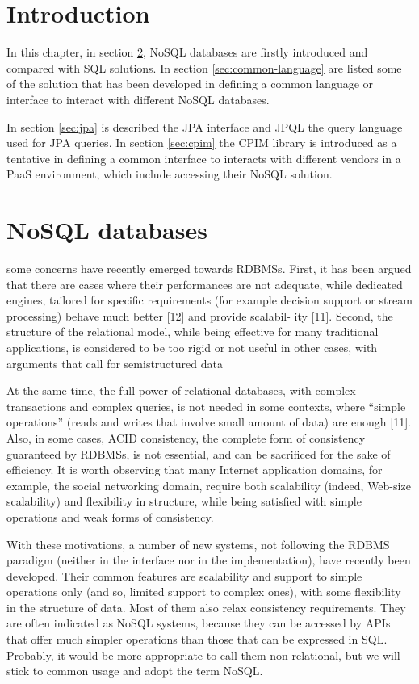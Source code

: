 \section{Introduction}
In this chapter, in section \ref{sec:nosql}, NoSQL databases are firstly introduced and compared with SQL solutions. In section \ref{sec:common-language} are listed some of the solution that has been developed in defining a common language or interface to interact with different NoSQL databases.

\noindent In section \ref{sec:jpa} is described the JPA interface and JPQL the query language used for JPA queries. In section \ref{sec:cpim} the CPIM library is introduced as a tentative in defining a common interface to interacts with different vendors in a PaaS environment, which include accessing their NoSQL solution.

\section{NoSQL databases}
\label{sec:nosql}
 some concerns have recently emerged towards RDBMSs. First, it has been argued that there are cases where their performances are not adequate, while dedicated engines, tailored for specific requirements (for example decision support or stream processing) behave much better [12] and provide scalabil- ity [11]. Second, the structure of the relational model, while being effective for many traditional applications, is considered to be too rigid or not useful in other cases, with arguments that call for semistructured data 
 
 At the same time, the full power of relational databases, with complex transactions and complex queries, is not needed in some contexts, where “simple operations” (reads and writes that involve small amount of data) are enough [11]. Also, in some cases, ACID consistency, the complete form of consistency guaranteed by RDBMSs, is not essential, and can be sacrificed for the sake of efficiency. It is worth observing that many Internet application domains, for example, the social networking domain, require both scalability (indeed, Web-size scalability) and flexibility in structure, while being satisfied with simple operations and weak forms of consistency.

With these motivations, a number of new systems, not following the RDBMS paradigm (neither in the interface nor in the implementation), have recently been developed. Their common features are scalability and support to simple operations only (and so, limited support to complex ones), with some flexibility in the structure of data. Most of them also relax consistency requirements. They are often indicated as NoSQL systems, because they can be accessed by APIs that offer much simpler operations than those that can be expressed in SQL. Probably, it would be more appropriate to call them non-relational, but we will stick to common usage and adopt the term NoSQL.

